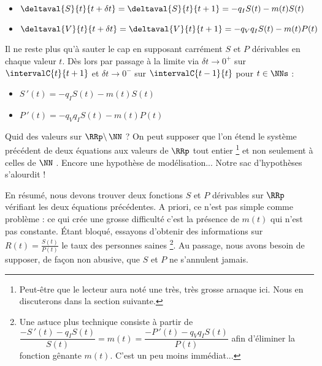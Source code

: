 \begin{itemize}[label=\small\textbullet]
	\item $\deltaval{S}{t}{t + \delta t} = \deltaval{S}{t}{t+1} = - q_I S(t) - m(t) S(t)$

	\item $\deltaval{V}{t}{t + \delta t} = \deltaval{V}{t}{t+1} = - q_V q_I S(t) - m(t) P(t)$
\end{itemize}

Il ne reste plus qu'à sauter le cap en supposant carrément $S$ et $P$ dérivables en chaque valeur $t$. Dès lors par passage à la limite via $\delta t \rightarrow 0^+$ sur $\intervalC{t}{t+1}$  et $\delta t \rightarrow 0^-$ sur $\intervalC{t-1}{t}$ pour $t \in \NNs$ :

\begin{itemize}[label=\small\textbullet]
	\item $S\,'(t) = - q_I S(t) - m(t) S(t)$

	\item $P\,'(t) = - q_V q_I S(t) - m(t) P(t)$
\end{itemize}

Quid des valeurs sur $\RRp \backslash \, \NN$ ? On peut supposer que l'on étend le système précédent de deux équations aux valeurs de $\RRp$ tout entier
\footnote{
	Peut-être que le lecteur aura noté une très, très grosse arnaque ici. Nous en discuterons dans la section suivante.
}
et non seulement à celles de $\NN$ . Encore une hypothèse de modélisation... Notre sac d'hypothèses s'alourdit !



\medskip


En résumé, nous devons trouver deux fonctions $S$ et $P$ dérivables sur $\RRp$ vérifiant les deux équations précédentes.
A priori, ce n'est pas simple comme problème : ce qui crée une grosse difficulté c'est la présence de $m(t)$ qui n'est pas constante. Étant bloqué, essayons d'obtenir des informations sur $R(t) = \frac{S(t)}{P(t)}$ le taux des personnes saines  
\footnote{
	Une astuce plus technique consiste à partir de $\dfrac{- S\,'(t) - q_I S(t)}{S(t)} = m(t) = \dfrac{- P\,'(t) - q_V q_I S(t)}{P(t)}$ afin d'éliminer la fonction gênante $m(t)$.
	C'est un peu moins immédiat...
}.
Au passage, nous avons besoin de supposer, de façon non abusive, que $S$ et $P$ ne s'annulent jamais.

\vspace{-1em}

